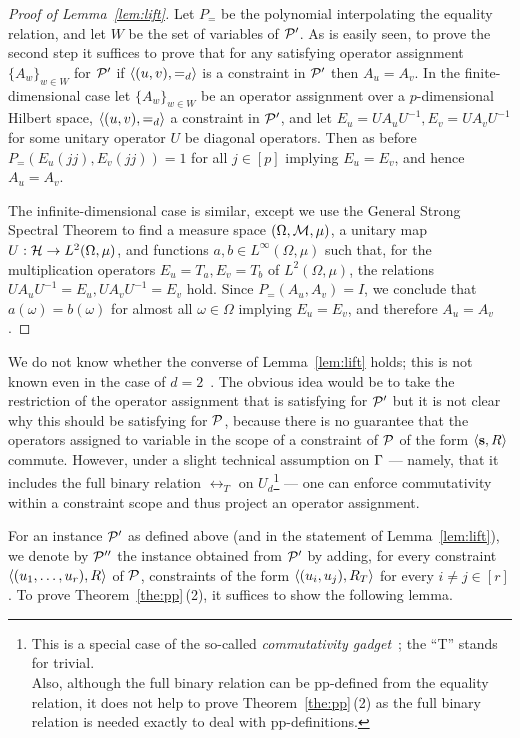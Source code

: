 \begin{proof}[Proof of Lemma~\ref{lem:lift}]
\smallskip

Let $P_=$ be the polynomial interpolating the equality relation, and let $W$ be the set of variables of ${\mathcal P}'$. As is easily seen, to prove the second step it suffices to prove that for any satisfying operator assignment $\{A_w\}_{w\in W}$ for ${\mathcal P}'$ if $\langle (u,v),=_d \rangle$ is a constraint in ${\mathcal P}'$ then $A_u=A_v$. In the finite-dimensional case let $\{A_w\}_{w\in W}$ be an operator assignment over a $p$-dimensional Hilbert space, $\langle (u,v),=_d \rangle$ a constraint in ${\mathcal P}'$, and let $E_u=UA_uU^{-1}, E_v=UA_vU^{-1}$ for some unitary operator $U$ be diagonal operators. Then as before $P_=(E_u(jj),E_v(jj))=1$ for all $j\in[p]$ implying $E_u=E_v$, and hence $A_u=A_v$.

The infinite-dimensional case is similar, except we use the General Strong Spectral Theorem to find a measure space $(\Omega,{\mathcal M},\mu)$, a unitary map $U:{\mathcal H}\to L^2(\Omega,\mu)$, and functions $a,b\in L^\infty(\Omega,\mu)$ such
that, for the multiplication operators $E_u = T_a, E_v=T_b$ of $L^2(\Omega,\mu)$, the relations 
$U A_uU^{-1} = E_u, UA_vU^{-1}=E_v$ hold. Since $P_=(A_u,A_v)=I$, we conclude that $a(\omega)=b(\omega)$ for almost all $\omega\in\Omega$ implying $E_u=E_v$, and therefore $A_u=A_v$. 
\end{proof}

We do not know whether the converse of Lemma~\ref{lem:lift} holds; this is not known even in the case of $d=2$~\cite{AKS19:jcss}.
%
The obvious idea would be to take the restriction of the operator assignment
that is satisfying for ${\mathcal P}'$ but it is not clear why this should be satisfying
for ${\mathcal P}$, because there is no guarantee that the operators assigned to variable in the scope of a constraint of ${\mathcal P}$ of the form $\langle {\bf s}, R \rangle$ commute. However, under a slight technical assumption on $\Gamma$ --- namely,
that it includes the full binary relation $\rel_T$ on $U_d$\footnote{This is a special case of the
so-called \emph{commutativity gadget}~\cite{AKS19:jcss}; the ``T'' stands for
trivial.\\ Also, although the full binary relation can be pp-defined from the equality relation, it does not help to prove Theorem~\ref{the:pp}\,(2) as the full binary relation is needed exactly to deal with pp-definitions.} --- one can
enforce commutativity within a constraint scope and thus project an operator
assignment. 

For an instance ${\mathcal P}'$ as defined above (and in the statement of Lemma~\ref{lem:lift}), we denote by ${\mathcal P}''$ the instance obtained from ${\mathcal P}'$ by adding, for every constraint $\langle (u _1,\ldots, u _{r}),R \rangle$ of ${\mathcal P}$, constraints of the form $\langle (u_i,u_j),R_T \rangle$ for every $i\neq j\in [r]$.
%
To prove Theorem~\ref{the:pp}\,(2), it suffices to show the following lemma.

